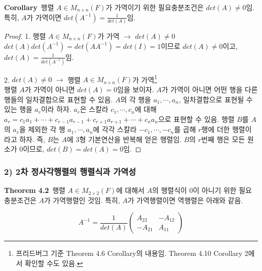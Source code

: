 \textbf{Corollary}\, 행렬 $A \in M_{n \times n}(F)$가 가역이기 위한 필요충분조건은 $det(A) \neq 0$임. 특히, $A$가 가역이면 $det(A^{-1})=\frac{1}{det(A)}$임.

\begin{proof}
1. 행렬 $A \in M_{n \times n}(F)$가 가역 $\rightarrow$ $det(A) \neq 0$\\
$det(A)det(A^{-1})=det(AA^{-1})=det(I)=1$이므로 $det(A) \neq 0$이고, $det(A)=\frac{1}{det(A^{-1})}$임.

2. $det(A) \neq 0$ $\rightarrow$ 행렬 $A \in M_{n \times n}(F)$가 가역\footnote{프리드버그 기준 Theorem 4.6 Corollary의 내용임. Theorem 4.10 Corollary 2에서 확인할 수도 있음.}\\
행렬 $A$가 가역이 아니면 $det(A)=0$임을 보이자. $A$가 가역이 아니면 어떤 행을 다른 행들의 일차결합으로 표현할 수 있음. $A$의 각 행을 $a_1, \cdots, a_n$, 일차결합으로 표현될 수 있는 행을 $a_r$이라 하자. $a_r$은 스칼라 $c_1, \cdots ,c_n$에 대해 $a_r=c_1a_1+ \cdots +c_{r-1}a_{r-1}+c_{r+1}a_{r+1}+ \cdots +c_na_n$으로 표현할 수 있음. 행렬 $B$를 $A$의 $a_r$을 제외한 각 행 $a_1, \cdots ,a_n$에 각각 스칼라 $-c_1, \cdots ,-c_n$를 곱해 $r$행에 더한 행렬이라고 하자. 즉, $B$는 $A$에 3형 기본연산을 반복해 얻은 행렬임. $B$의 $r$번째 행은 모든 원소가 0이므로, $det(B)=det(A)=0$임.
\end{proof}


\newpage


\subsubsection*{2) 2차 정사각행렬의 행렬식과 가역성}
\textbf{Theorem 4.2}\, 행렬 $A \in M_{2 \times 2}(F)$에 대해서 $A$의 행렬식이 0이 아니기 위한 필요충분조건은 $A$가 가역행렬인 것임. 특히, $A$가 가역행렬이면 역행렬은 아래와 같음.

\[
A^{-1}=\frac{1}{det(A)}
\begin{pmatrix}
A_{22} & -A_{12}\\
-A_{21} & A_{11}
\end{pmatrix}
\]

